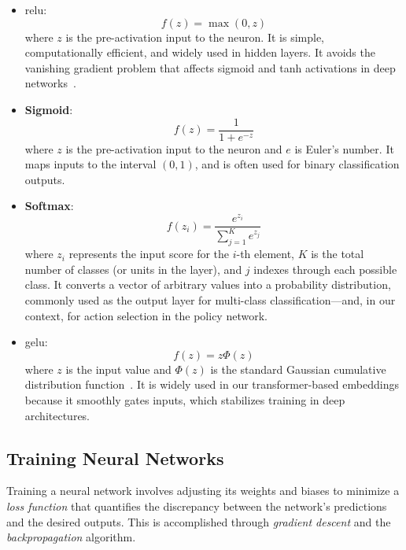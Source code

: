 \begin{itemize}
    \item \gls{relu}: 
    \begin{equation}
        f(z) = \max(0, z)
    \end{equation}
    where $z$ is the pre-activation input to the neuron. It is simple, computationally efficient, and widely used in hidden layers. It avoids the vanishing gradient problem that affects sigmoid and tanh activations in deep networks~\cite{Goodfellow-et-al-2016}.
    
    \item \textbf{Sigmoid}: 
    \begin{equation}
        f(z) = \frac{1}{1 + e^{-z}}
    \end{equation}
    where $z$ is the pre-activation input to the neuron and $e$ is Euler's number. It maps inputs to the interval $(0, 1)$, and is often used for binary classification outputs.
    
    \item \textbf{Softmax}: 
    \begin{equation}
        f(z_i) = \frac{e^{z_i}}{\sum_{j=1}^{K} e^{z_j}}
    \end{equation}
    where $z_i$ represents the input score for the $i$-th element, $K$ is the total number of classes (or units in the layer), and $j$ indexes through each possible class. It converts a vector of arbitrary values into a probability distribution, commonly used as the output layer for multi-class classification—and, in our context, for action selection in the policy network.
    
    \item \gls{gelu}: 
    \begin{equation}
        f(z) = z \Phi(z)
    \end{equation}
    where $z$ is the input value and $\Phi(z)$ is the standard Gaussian cumulative distribution function~\cite{hendrycks2016gelu}. It is widely used in our transformer-based embeddings because it smoothly gates inputs, which stabilizes training in deep architectures.
\end{itemize}

\subsection{Training Neural Networks}

Training a neural network involves adjusting its weights and biases to minimize a \textit{loss function} that quantifies the discrepancy between the network's predictions and the desired outputs. This is accomplished through \textit{gradient descent} and the \textit{backpropagation} algorithm.

